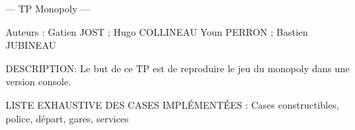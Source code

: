 --- TP Monopoly ---

Auteurs \+: Gatien JOST ; Hugo COLLINEAU Youn PERRON ; Bastien JUBINEAU

DESCRIPTION\+: Le but de ce TP est de reproduire le jeu du monopoly dans une version console.

LISTE EXHAUSTIVE DES CASES IMPLÉ\+MENTÉ\+ES \+: Cases constructibles, police, départ, gares, services 